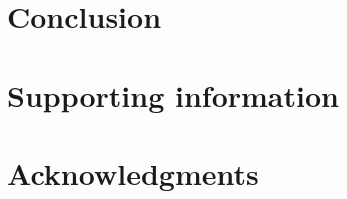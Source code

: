 \documentclass[10pt,letterpaper]{article}
\begin{document}
\section*{Conclusion}



\section*{Supporting information}


\section*{Acknowledgments}

\nolinenumbers

%
%
\end{document}
